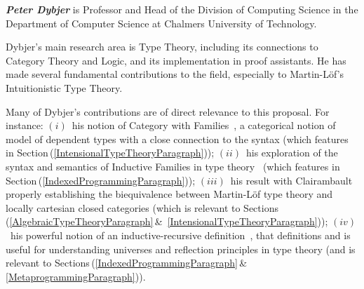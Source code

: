 \documentclass[11pt,twocolumn]{article}
\newcommand{\pref}[1]{\,(\ref{#1})}
\begin{document}
\smallskip\noindent
\textbf{\em Peter Dybjer} 
%
%
is Professor and Head of the Division of Computing Science in the
Department of Computer Science at Chalmers University of Technology.

Dybjer's main research area is Type Theory, including its connections to
Category Theory and Logic, and its implementation in proof assistants.
He has made several fundamental contributions to the field, especially to
Martin-L\"of's Intuitionistic Type Theory.  

Many of Dybjer's contributions are of direct relevance to this proposal.
For instance: 
%
$(i)$~his notion of Category with Families~\cite{DybjerITT}, a categorical
notion of model of dependent types with a close connection to the syntax
(which features in Section\mbox{\pref{IntensionalTypeTheoryParagraph}}); 
%
$(ii)$~his exploration of the syntax and semantics of Inductive Families
in type theory~\cite{DybjerIF} (which features in
Section\mbox{\pref{IndexedProgrammingParagraph}}); 
%
$(iii)$~his result with Clairambault~\cite{DybjerClairambault} properly
establishing the biequivalence between Martin-L\"of type theory and
locally cartesian closed categories 
(which is relevant to 
Sections\,(\mbox{\ref{AlgebraicTypeTheoryParagraph}}\,\&\,%
\ref{IntensionalTypeTheoryParagraph}));
%
$(iv)$~his powerful notion of an inductive-recursive
definition~\cite{DybjerIR}, that %
definitions and is useful for understanding universes and reflection
principles in type theory 
(and is relevant to Sections\,(\ref{IndexedProgrammingParagraph}\,\&\,%
\ref{MetaprogrammingParagraph})). %
%
%
\end{document}
